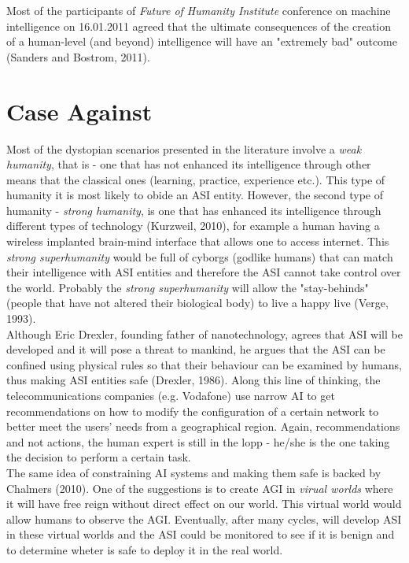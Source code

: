 \documentclass[11pt]{article}
\begin{document}
	\indent
	Most of the participants of \textit{Future of Humanity Institute} conference on machine intelligence on 16.01.2011 agreed that the ultimate consequences of the creation of a human-level (and beyond) intelligence will have an "extremely bad" outcome (Sanders and Bostrom, 2011).



\section*{Case Against}
	Most of the dystopian scenarios presented in the literature involve a \textit{weak humanity}, that is - one that has not enhanced its intelligence through other means that the classical ones (learning, practice, experience etc.). This type of humanity it is most likely to obide an ASI entity. However, the second type of humanity - \textit{strong humanity}, is one that has enhanced its intelligence through different types of technology (Kurzweil, 2010), for example a human having a wireless implanted brain-mind interface that allows one to access internet. This \textit{strong superhumanity} would be full of cyborgs (godlike humans) that can match their intelligence with ASI entities and therefore the ASI cannot take control over the world. Probably the \textit{strong superhumanity} will allow the  "stay-behinds" (people that have not altered their biological body) to live a happy live (Verge, 1993). \\

	\indent
Although Eric Drexler, founding father of nanotechnology, agrees that ASI will be developed and it will pose a threat to mankind, he argues that the ASI can be confined using physical rules so that their behaviour can be examined by humans, thus making ASI entities safe (Drexler, 1986). Along this line of thinking, the telecommunications companies (e.g. Vodafone) use narrow AI to get recommendations on how to modify the configuration of a certain network to better meet the users' needs from a geographical region. Again, recommendations and not actions, the human expert is still in the lopp - he/she is the one taking the decision to perform a certain task.\\ 

	\indent
The same idea of constraining AI systems and making them safe is backed by Chalmers (2010). One of the suggestions is to create AGI in \textit{virual worlds} where it will have free reign without direct effect on our world. This virtual world would allow humans to observe the AGI. Eventually, after many cycles, will develop ASI in these virtual worlds and the ASI could be monitored to see if it is benign and to determine wheter is safe to deploy it in the real world.\\
  
\end{document}
